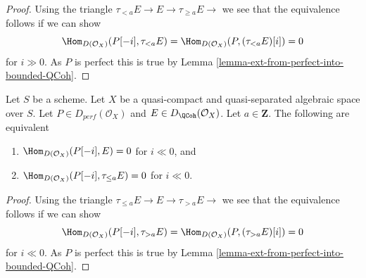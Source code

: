 \begin{proof}
Using the triangle $ \tau_{< a} E \to E \to \tau_{\geq a} E \to$
we see that the equivalence follows if we can show
$$
\Hom_{D(\mathcal{O}_X)}(P[-i], \tau_{< a} E) =
\Hom_{D(\mathcal{O}_X)}(P, (\tau_{< a} E)[i]) = 0
$$
for $i \gg 0$. As $P$ is perfect this is true by
Lemma \ref{lemma-ext-from-perfect-into-bounded-QCoh}.
\end{proof}

\begin{lemma}
\label{lemma-bounded-below-truncation}
Let $S$ be a scheme.
Let $X$ be a quasi-compact and quasi-separated algebraic space over $S$. Let
$P \in D_{perf}(\mathcal{O}_X)$ and $E \in D_{\QCoh}(\mathcal{O}_X)$.
Let $a \in \mathbf{Z}$. The following are equivalent
\begin{enumerate}
\item $\Hom_{D(\mathcal{O}_X)}(P[-i], E) = 0$ for $i \ll 0$, and
\item $\Hom_{D(\mathcal{O}_X)}(P[-i], \tau_{\leq a} E) = 0$ for $i \ll 0$.
\end{enumerate}
\end{lemma}

\begin{proof}
Using the triangle $ \tau_{\leq a} E \to E \to \tau_{> a} E \to$
we see that the equivalence follows if we can show
$$
\Hom_{D(\mathcal{O}_X)}(P[-i], \tau_{> a} E) =
\Hom_{D(\mathcal{O}_X)}(P, (\tau_{> a} E)[i]) = 0
$$
for $i \ll 0$. As $P$ is perfect this is true by
Lemma \ref{lemma-ext-from-perfect-into-bounded-QCoh}.
\end{proof}

